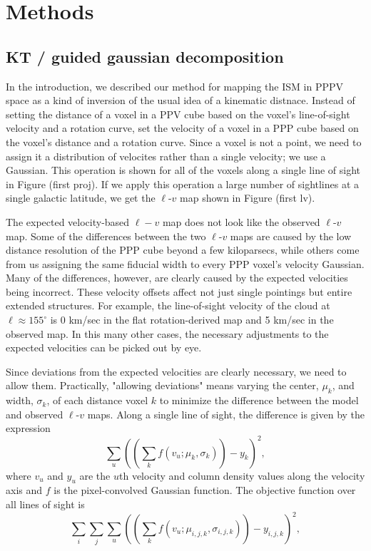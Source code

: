 \section{Methods}

\subsection{KT / guided gaussian decomposition}

In the introduction, we described our method for mapping the ISM in PPPV space as a kind of inversion of the usual idea of a kinematic distnace. Instead of setting the distance of a voxel in a PPV cube based on the voxel's line-of-sight velocity and a rotation curve, set the velocity of a voxel in a PPP cube based on the voxel's distance and a rotation curve. Since a voxel is not a point, we need to assign it a distribution of velocites rather than a single velocity; we use a Gaussian. This operation is shown for all of the voxels along a single line of sight in Figure (first proj). If we apply this operation a large number of sightlines at a single galactic latitude, we get the $\ell$-$v$ map shown in Figure (first lv). 

The expected velocity-based $\ell-v$ map does not look like the observed $\ell$-$v$ map. Some of the differences between the two $\ell$-$v$ maps are  caused by the low distance resolution of the PPP cube beyond a few kiloparsecs, while others come from us assigning the same fiducial width to every PPP voxel's velocity Gaussian. Many of the differences, however, are clearly caused by the expected velocities being incorrect. These velocity offsets affect not just single pointings but entire extended structures. For example, the line-of-sight velocity of the cloud at $\ell \approx 155^\circ$ is 0 km/sec in the flat rotation-derived map and 5 km/sec in the observed map. In this many other cases, the necessary adjustments to the expected velocities can be picked out by eye.

Since deviations from the expected velocities are clearly necessary, we need to allow them. Practically, "allowing deviations" means varying the center, $\mu_k$, and width, $\sigma_k$, of each distance voxel $k$ to minimize the difference between the model and observed $\ell$-$v$ maps. Along a single line of sight, the difference is given by the expression
\begin{equation}
    \sum_u ((\sum_k f(v_u; \mu_k, \sigma_k)) - y_k)^2,
\end{equation}
where $v_u$ and $y_u$ are the $u$th velocity and column density values along the velocity axis and $f$ is the pixel-convolved Gaussian function.
The objective function over all lines of sight is
\begin{equation}
\label{eq:objective-nosprings}
    \sum_i \sum_j \sum_u ((\sum_k f(v_u; \mu_{i,j,k}, \sigma_{i,j,k})) - y_{i,j,k})^2,
\end{equation}

